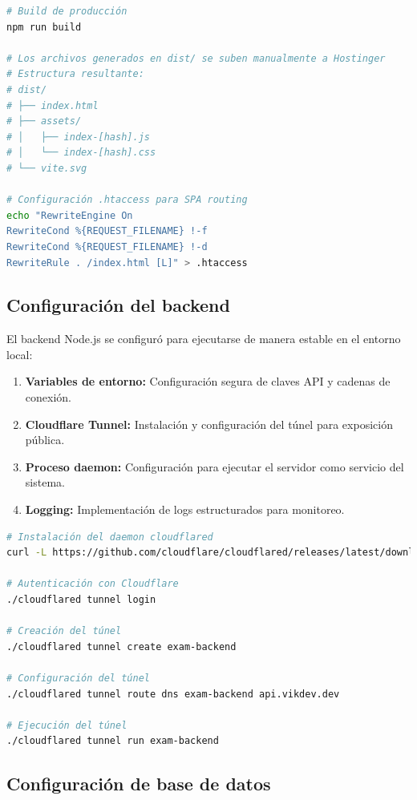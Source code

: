 \documentclass[12pt,a4paper]{report}
\begin{document}
\begin{lstlisting}[language=bash, caption=Proceso de build y despliegue del frontend]
# Build de producción
npm run build

# Los archivos generados en dist/ se suben manualmente a Hostinger
# Estructura resultante:
# dist/
# ├── index.html
# ├── assets/
# │   ├── index-[hash].js
# │   └── index-[hash].css
# └── vite.svg

# Configuración .htaccess para SPA routing
echo "RewriteEngine On
RewriteCond %{REQUEST_FILENAME} !-f
RewriteCond %{REQUEST_FILENAME} !-d
RewriteRule . /index.html [L]" > .htaccess
\end{lstlisting}

\subsection{Configuración del backend}

El backend Node.js se configuró para ejecutarse de manera estable en el entorno local:

\begin{enumerate}
\item \textbf{Variables de entorno:} Configuración segura de claves API y cadenas de conexión.
\item \textbf{Cloudflare Tunnel:} Instalación y configuración del túnel para exposición pública.
\item \textbf{Proceso daemon:} Configuración para ejecutar el servidor como servicio del sistema.
\item \textbf{Logging:} Implementación de logs estructurados para monitoreo.
\end{enumerate}

\begin{lstlisting}[language=bash, caption=Configuración del túnel Cloudflare]
# Instalación del daemon cloudflared
curl -L https://github.com/cloudflare/cloudflared/releases/latest/download/cloudflared-linux-amd64 -o cloudflared

# Autenticación con Cloudflare
./cloudflared tunnel login

# Creación del túnel
./cloudflared tunnel create exam-backend

# Configuración del túnel
./cloudflared tunnel route dns exam-backend api.vikdev.dev

# Ejecución del túnel
./cloudflared tunnel run exam-backend
\end{lstlisting}

\subsection{Configuración de base de datos}
\end{document}

